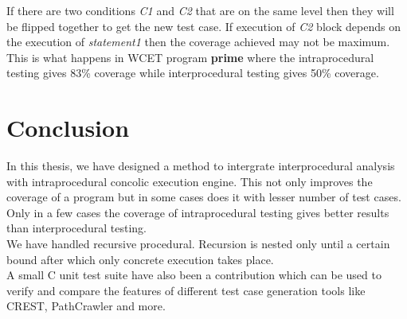 \documentclass[12pt,oneside]{book}
\begin{document}
If there are two conditions \textit{C1} and \textit{C2} that are on the same level then they will be flipped together to get the new test case. If execution of \textit{C2} block depends on the execution of \textit{statement1} then the coverage achieved may not be maximum. This is what happens in WCET program \textbf{prime} where the intraprocedural testing gives 83\% coverage while interprocedural testing gives 50\% coverage.















\chapter{Conclusion}
In this thesis, we have designed a method to intergrate interprocedural analysis with intraprocedural concolic execution engine. This not only improves the coverage of a program but in some cases does it with lesser number of test cases. Only in a few cases the coverage of intraprocedural testing gives better results than interprocedural testing.\\  
We have handled recursive procedural. Recursion is nested only until a certain bound after which only concrete execution takes place.\\
A small C unit test suite have also been a contribution which can be used to verify and compare the features of different test case generation tools like CREST\cite{crest}, PathCrawler\cite{pathcrawler} and more.  











  
\end{document}
